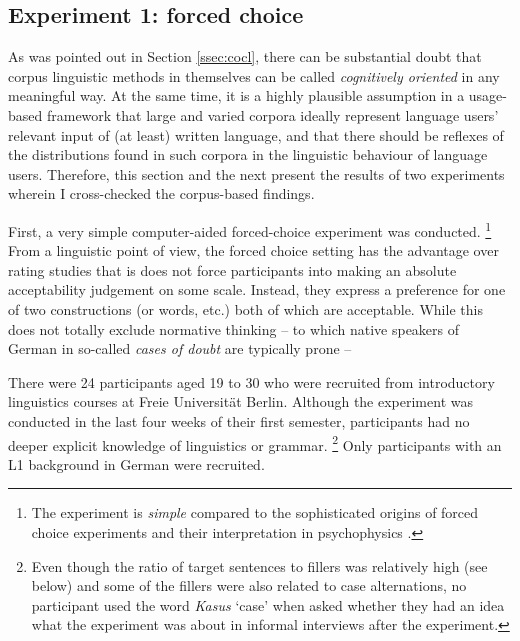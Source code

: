 \documentclass[USenglish]{article}
\begin{document}
%

\subsection{Experiment 1: forced choice}

As was pointed out in Section \ref{ssec:cocl}, there can be substantial doubt that corpus linguistic methods in themselves can be called \textit{cognitively oriented} in any meaningful way.
At the same time, it is a highly plausible assumption in a usage-based framework that large and varied corpora ideally represent language users' relevant input of (at least) written language, and that there should be reflexes of the distributions found in such corpora in the linguistic behaviour of language users.
Therefore, this section and the next present the results of two experiments wherein I cross-checked the corpus-based findings.

First, a very simple computer-aided forced-choice experiment was conducted.%
\footnote{The experiment is \textit{simple} compared to the sophisticated origins of forced choice experiments and their interpretation in psychophysics \citep[166--179]{MacmillanCreelman2005}.}
From a linguistic point of view, the forced choice setting has the advantage over rating studies that is does not force participants into making an absolute acceptability judgement on some scale.
Instead, they express a preference for one of two constructions (or words, etc.) both of which are acceptable.
While this does not totally exclude normative thinking -- to which native speakers of German in so-called \textit{cases of doubt} are typically prone -- 

There were 24 participants aged 19 to 30 who were recruited from introductory linguistics courses at Freie Universität Berlin.
Although the experiment was conducted in the last four weeks of their first semester, participants had no deeper explicit knowledge of linguistics or grammar.%
\footnote{Even though the ratio of target sentences to fillers was relatively high (see below) and some of the fillers were also related to case alternations, no participant used the word \textit{Kasus} `case' when asked whether they had an idea what the experiment was about in informal interviews after the experiment.}
Only participants with an L1 background in German were recruited.
\end{document}
